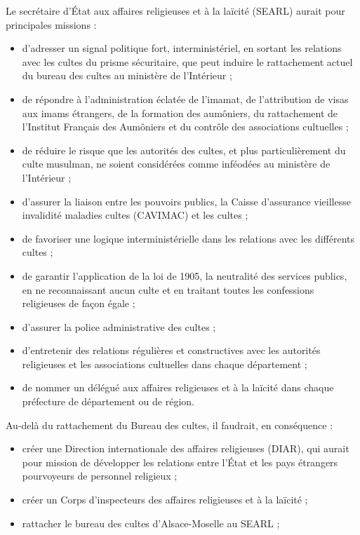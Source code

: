 Le secrétaire d'État aux affaires religieuses et à la laïcité (SEARL)
aurait pour principales missions :


\begin{itemize}
\item
  d'adresser un signal politique fort, interministériel, en sortant les
  relations avec les cultes du prisme sécuritaire, que peut induire le
  rattachement actuel du bureau des cultes au ministère de l'Intérieur ;
\item
  de répondre à l'administration éclatée de l'imamat, de l'attribution
  de visas aux imams étrangers, de la formation des aumôniers, du
  rattachement de l'Institut Français des Aumôniers et du contrôle des
  associations cultuelles ;
\item
  de réduire le risque que les autorités des cultes, et plus
  particulièrement du culte musulman, ne soient considérées comme
  inféodées au ministère de l'Intérieur ;
\item
  d'assurer la liaison entre les pouvoirs publics, la Caisse d'assurance
  vieillesse invalidité maladies cultes (CAVIMAC) et les cultes ;
\item
  de favoriser une logique interministérielle dans les relations avec
  les différents cultes ;
\item
  de garantir l'application de la loi de 1905, la neutralité des
  services publics, en ne reconnaissant aucun culte et en traitant
  toutes les confessions religieuses de façon égale ;
\item
  d'assurer la police administrative des cultes ;
\item
  d'entretenir des relations régulières et constructives avec les
  autorités religieuses et les associations cultuelles dans chaque
  département ;
\item
  de nommer un délégué aux affaires religieuses et à la laïcité dans
  chaque préfecture de département ou de région.
\end{itemize}


Au-delà du rattachement du Bureau des cultes, il faudrait, en
conséquence :


\begin{itemize}
\item
  créer une Direction internationale des affaires religieuses (DIAR),
  qui aurait pour mission de développer les relations entre l'État et
  les pays étrangers pourvoyeurs de personnel religieux ;
\item
  créer un Corps d'inspecteurs des affaires religieuses et à la laïcité
  ;
\item
  rattacher le bureau des cultes d'Alsace-Moselle au SEARL ;
\end{itemize}


